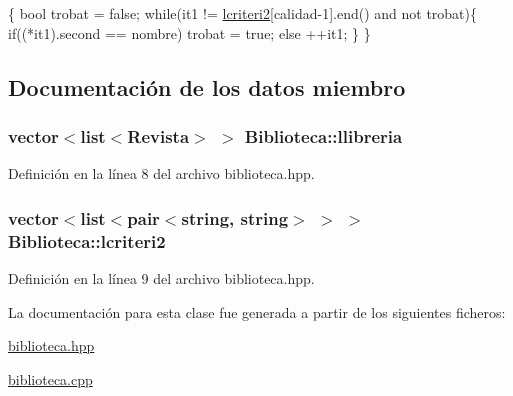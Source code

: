 \begin{DoxyCode}
                                                                               
                                                 \{
  \textcolor{keywordtype}{bool} trobat  = \textcolor{keyword}{false};
  \textcolor{keywordflow}{while}(it1 != \hyperlink{class_biblioteca_a21ee23518a39957324cee31512482753}{lcriteri2}[calidad-1].end() and not trobat)\{
    \textcolor{keywordflow}{if}((*it1).second == nombre) trobat = \textcolor{keyword}{true};
    \textcolor{keywordflow}{else} ++it1;
  \}
\} 
\end{DoxyCode}


\subsection{Documentación de los datos miembro}
\hypertarget{class_biblioteca_a4c02ad960e27222ea30b9a3c663009b8}{
\subsubsection[{llibreria}]{\setlength{\rightskip}{0pt plus 5cm}vector$<$list$<${\bf Revista}$>$ $>$ Biblioteca\-::llibreria\hspace{0.3cm}{\ttfamily [private]}}}\label{class_biblioteca_a4c02ad960e27222ea30b9a3c663009b8}


Definición en la línea 8 del archivo biblioteca.\-hpp.

\hypertarget{class_biblioteca_a21ee23518a39957324cee31512482753}{
\subsubsection[{lcriteri2}]{\setlength{\rightskip}{0pt plus 5cm}vector$<$list$<$pair$<$string, string$>$ $>$ $>$ Biblioteca\-::lcriteri2\hspace{0.3cm}{\ttfamily [private]}}}\label{class_biblioteca_a21ee23518a39957324cee31512482753}


Definición en la línea 9 del archivo biblioteca.\-hpp.



La documentación para esta clase fue generada a partir de los siguientes ficheros\-:\begin{DoxyCompactItemize}
\item 
\hyperlink{biblioteca_8hpp}{biblioteca.\-hpp}\item 
\hyperlink{biblioteca_8cpp}{biblioteca.\-cpp}\end{DoxyCompactItemize}
